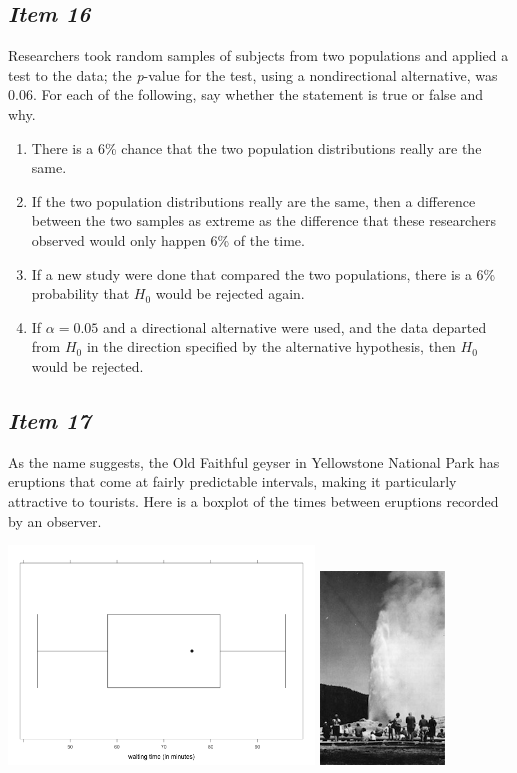 \subsection{\textbf{\textit{Item 16}}}
Researchers took random samples of subjects from two populations and applied a test to the data; the \textit{p}-value for the test, using a nondirectional alternative, was 0.06.  For each of the following, say whether the statement is true or false and why.
\begin{enumerate}[leftmargin=1cm, itemsep=.2em]
\item There is a 6\% chance that the two population distributions really are the same.
\item If the two population distributions really are the same, then a difference between the two samples as extreme as the difference that these researchers observed would only happen 6\% of the time.
\item If a new study were done that compared the two populations, there is a 6\% probability that $H_0$ would be rejected again.
\item If $\alpha = 0.05$ and a directional alternative were used, and the data departed from $H_0$ in the direction specified by the alternative hypothesis, then $H_0$ would be rejected.
\end{enumerate}

\subsection{\textbf{\textit{Item 17}}}

As the name suggests, the Old Faithful geyser in Yellowstone National
Park has eruptions that come at fairly predictable intervals, making
it particularly attractive to tourists.  Here is a boxplot of the times
between eruptions recorded by an observer.

\noindent
\includegraphics[width=3.2in]{includes/faithful1.png}
   \hspace*{.10in}\includegraphics[width=1.3in]{includes/old-faithful.jpg}

